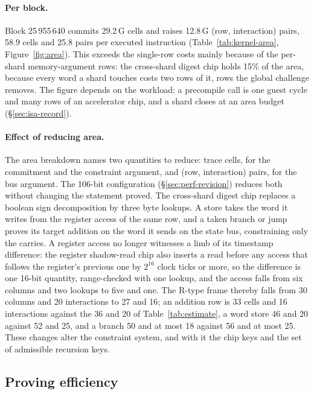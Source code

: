 \paragraph{Per block.}\label{sec:perf-profile} Block 25\,955\,640 commits 29.2\,G cells and raises 12.8\,G (row, interaction) pairs, 58.9 cells and 25.8 pairs per executed instruction (Table~\ref{tab:kernel-area}, Figure~\ref{fig:area}). This exceeds the single-row costs mainly because of the per-shard memory-argument rows: the cross-shard digest chip holds 15\% of the area, because every word a shard touches costs two rows of it, rows the global challenge removes. The figure depends on the workload: a precompile call is one guest cycle and many rows of an accelerator chip, and a shard closes at an area budget (\S\ref{sec:isa-record}).

\paragraph{Effect of reducing area.}\label{sec:perf-changes} The area breakdown names two quantities to reduce: trace cells, for the commitment and the constraint argument, and (row, interaction) pairs, for the bus argument. The 106-bit configuration (\S\ref{sec:perf-revision}) reduces both without changing the statement proved. The cross-shard digest chip replaces a boolean sign decomposition by three byte lookups. A store takes the word it writes from the register access of the same row, and a taken branch or jump proves its target addition on the word it sends on the state bus, constraining only the carries. A register access no longer witnesses a limb of its timestamp difference: the register shadow-read chip also inserts a read before any access that follows the register's previous one by $2^{16}$ clock ticks or more, so the difference is one 16-bit quantity, range-checked with one lookup, and the access falls from six columns and two lookups to five and one. The R-type frame thereby falls from 30 columns and 20 interactions to 27 and 16; an addition row is 33 cells and 16 interactions against the 36 and 20 of Table~\ref{tab:estimate}, a word store 46 and 20 against 52 and 25, and a branch 50 and at most 18 against 56 and at most 25. These changes alter the constraint system, and with it the chip keys and the set of admissible recursion keys.

\subsection{Proving efficiency}
\label{sec:perf-prover}

